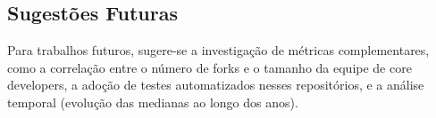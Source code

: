 \documentclass[12pt,a4paper]{article}
\begin{document}
\subsection*{Sugestões Futuras}
Para trabalhos futuros, sugere-se a investigação de métricas complementares, como a correlação entre o número de forks e o tamanho da equipe de core developers, a adoção de testes automatizados nesses repositórios, e a análise temporal (evolução das medianas ao longo dos anos).
\end{document}
